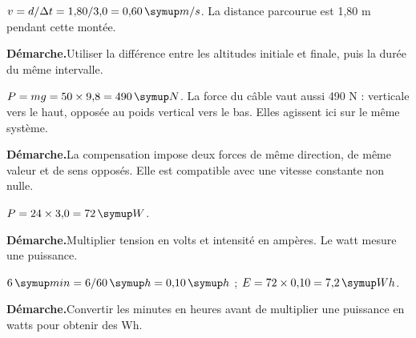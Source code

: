 \par\noindent\begin{minipage}{\linewidth}$v=d/\Delta t=1{,}80/3{,}0=0{,}60\unite{m/s}$. La distance parcourue est 1,80 m pendant cette montée.\par\smallskip\textbf{Démarche.}\enspace Utiliser la différence entre les altitudes initiale et finale, puis la durée du même intervalle.\par{}\end{minipage}\par
\par\noindent\begin{minipage}{\linewidth}$P=mg=50\times9{,}8=490\unite N$. La force du câble vaut aussi 490 N : verticale vers le haut, opposée au poids vertical vers le bas. Elles agissent ici sur le même système.\par\smallskip\textbf{Démarche.}\enspace La compensation impose deux forces de même direction, de même valeur et de sens opposés. Elle est compatible avec une vitesse constante non nulle.\par{}\end{minipage}\par
{}
\par\noindent\begin{minipage}{\linewidth}$P=24\times3{,}0=72\unite W$.\par\smallskip\textbf{Démarche.}\enspace Multiplier tension en volts et intensité en ampères. Le watt mesure une puissance.\par{}\end{minipage}\par
\par\noindent\begin{minipage}{\linewidth}$6\unite{min}=6/60\unite h=0{,}10\unite h$ ; $E=72\times0{,}10=7{,}2\unite{Wh}$.\par\smallskip\textbf{Démarche.}\enspace Convertir les minutes en heures avant de multiplier une puissance en watts pour obtenir des Wh.\par{}\end{minipage}\par
